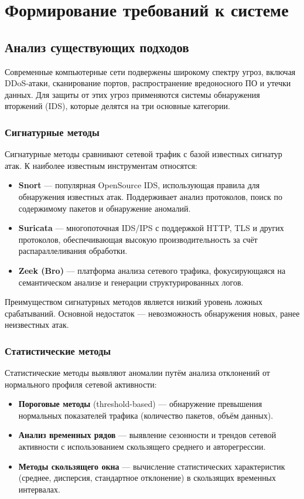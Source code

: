 \chapter{Формирование требований к системе}

\section{Анализ существующих подходов}

Современные компьютерные сети подвержены широкому спектру угроз, включая DDoS-атаки, сканирование портов, распространение вредоносного ПО и утечки данных. Для защиты от этих угроз применяются системы обнаружения вторжений (IDS), которые делятся на три основные категории.

\subsection{Сигнатурные методы}

Сигнатурные методы сравнивают сетевой трафик с базой известных сигнатур атак. К наиболее известным инструментам относятся:

\begin{itemize}
    \item \textbf{Snort} — популярная OpenSource IDS, использующая правила для обнаружения известных атак. Поддерживает анализ протоколов, поиск по содержимому пакетов и обнаружение аномалий.
    \item \textbf{Suricata} — многопоточная IDS/IPS с поддержкой HTTP, TLS и других протоколов, обеспечивающая высокую производительность за счёт распараллеливания обработки.
    \item \textbf{Zeek (Bro)} — платформа анализа сетевого трафика, фокусирующаяся на семантическом анализе и генерации структурированных логов.
\end{itemize}

Преимуществом сигнатурных методов является низкий уровень ложных срабатываний. Основной недостаток — невозможность обнаружения новых, ранее неизвестных атак.

\subsection{Статистические методы}

Статистические методы выявляют аномалии путём анализа отклонений от нормального профиля сетевой активности:

\begin{itemize}
    \item \textbf{Пороговые методы} (threshold-based) — обнаружение превышения нормальных показателей трафика (количество пакетов, объём данных).
    \item \textbf{Анализ временных рядов} — выявление сезонности и трендов сетевой активности с использованием скользящего среднего и авторегрессии.
    \item \textbf{Методы скользящего окна} — вычисление статистических характеристик (среднее, дисперсия, стандартное отклонение) в скользящих временных интервалах.
\end{itemize}

